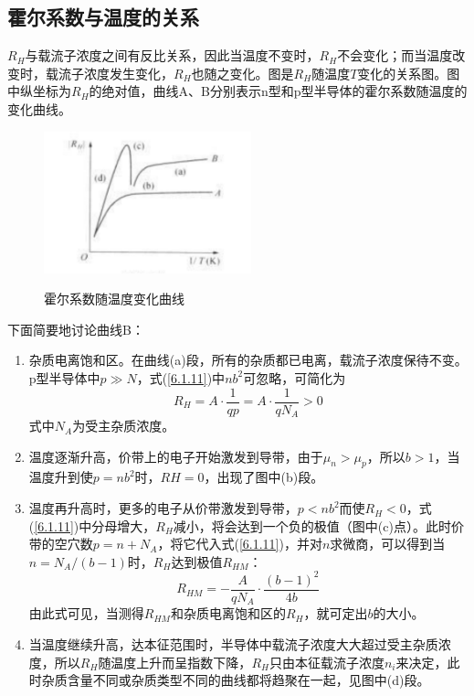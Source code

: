 \documentclass[a4paper]{article}
\begin{document}
\subsection{霍尔系数与温度的关系}
$R_H$与载流子浓度之间有反比关系，因此当温度不变时，$R_H$不会变化；而当温度改变时，载流子浓度发生变化，$R_H$也随之变化。图是$R_H$随温度$T$变化的关系图。图中纵坐标为$R_H$的绝对值，曲线A、B分别表示n型和p型半导体的霍尔系数随温度的变化曲线。
\begin{figure}[!h]
	\centering
	\includegraphics[width=6cm]{fig/fig2.png}\\
	\caption{霍尔系数随温度变化曲线}\label{fig2}
\end{figure}

下面简要地讨论曲线B：
\begin{enumerate}
\item 杂质电离饱和区。在曲线(a)段，所有的杂质都已电离，载流子浓度保待不变。p型半导体中$p\gg N$，式(\ref{6.1.11})中$nb^2$可忽略，可简化为
\begin{equation*}
R_H=A\cdot\frac{1}{q p}=A\cdot\frac{1}{q N_A}>0
\end{equation*}
式中$N_A$为受主杂质浓度。
\item 温度逐渐升高，价带上的电子开始激发到导带，由于$\mu_n>\mu_p$，所以$b>1$，当温度升到使$p = nb^2$时，$RH=0$，出现了图中(b)段。
\item 温度再升高时，更多的电子从价带激发到导带，$p<nb^2$而使$R_H<0$，式(\ref{6.1.11})中分母增大，$R_H$减小，将会达到一个负的极值（图中(c)点）。此时价带的空穴数$p=n+N_A$，将它代入式(\ref{6.1.11})，并对$n$求微商，可以得到当$n=N_A/(b-1)$时，$R_H$达到极值$R_{HM}$：
\begin{equation}\label{6.1.14}
R_{HM}=-\frac{A}{qN_A}\cdot \frac{(b-1)^2}{4b}
\end{equation}
由此式可见，当测得$R_{HM}$和杂质电离饱和区的$R_H$，就可定出$b$的大小。
\item 当温度继续升高，达本征范围时，半导体中载流子浓度大大超过受主杂质浓度，所以$R_H$随温度上升而呈指数下降，$R_H$只由本征载流子浓度$n_i$来决定，此时杂质含量不同或杂质类型不同的曲线都将趋聚在一起，见图中(d)段。
\end{enumerate}
\end{document}
